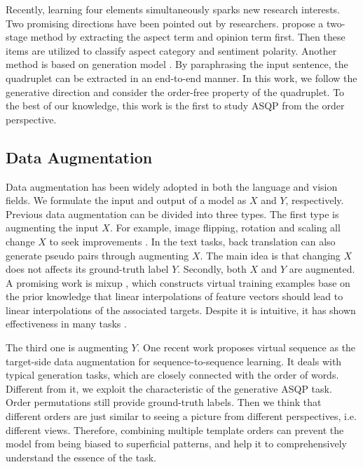 \documentclass[11pt]{article}
\begin{document}
Recently, learning four elements simultaneously sparks new research interests. Two promising directions have been pointed out by researchers. \citet{cai2021aspect} propose a two-stage method by extracting the aspect term and opinion term first. Then these items are utilized to classify aspect category and sentiment polarity. Another method is based on generation model \cite{zhang-etal-2021-aspect-sentiment}. By paraphrasing the input sentence, the quadruplet can be extracted in an end-to-end manner. In this work, we follow the generative direction and consider the order-free property of the quadruplet. To the best of our knowledge, this work is the first to study ASQP from the order perspective.



\subsection{Data Augmentation}
Data augmentation has been widely adopted in both the language and vision fields. We formulate the input and output of a model as $X$ and $Y$, respectively. Previous data augmentation can be divided into three types. The first type is augmenting the input $X$. For example, image flipping, rotation and scaling all change $X$ to seek improvements \cite{shorten2019survey}. In the text tasks, back translation \cite{sugiyama2019data} can also generate pseudo pairs through augmenting $X$. The main idea is that changing $X$ does not affects its ground-truth label $Y$. Secondly, both $X$ and $Y$ are augmented. A promising work is mixup \cite{zhang2018mixup}, which constructs virtual training examples base on the prior knowledge that linear interpolations of feature vectors should lead to linear interpolations of the associated targets. Despite it is intuitive, it has shown effectiveness in many tasks \cite{sun-etal-2020-mixup}. 

The third one is augmenting $Y$. One recent work proposes virtual sequence as the target-side data augmentation \cite{xie2022target} for sequence-to-sequence learning. It deals with typical generation tasks, which are closely connected with the order of words. Different from it, we exploit the characteristic of the generative ASQP task. Order permutations still provide ground-truth labels. Then we think that different orders are just similar to seeing a picture from different perspectives, i.e. different views. Therefore, combining multiple template orders can prevent the model from being biased to superficial patterns, and help it to comprehensively understand the essence of the task. 
\end{document}
